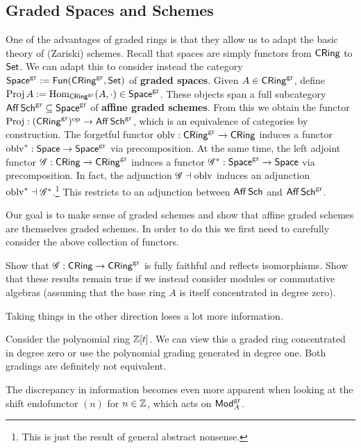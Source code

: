 \documentclass[11pt]{article}
\begin{document}
\subsection{Graded Spaces and Schemes}
One of the advantages of graded rings is that they allow us to adapt the basic theory of (Zariski) schemes. Recall that spaces are simply functors from $\operatorname{\mathsf{CRing}}$ to $\operatorname{\mathsf{Set}}$. We can adapt this to consider instead the category $\operatorname{\mathsf{Space}}^{\operatorname{gr}}:=\operatorname{\mathsf{Fun}}(\operatorname{\mathsf{CRing}}^{\operatorname{gr}},\operatorname{\mathsf{Set}})$ of \textbf{graded spaces}. Given $A\in\operatorname{\mathsf{CRing}}^{\operatorname{gr}}$, define $\operatorname{Proj} A:=\operatorname{Hom}_{\operatorname{\mathsf{CRing}}^{\operatorname{gr}}}(A,\cdot)\in\operatorname{\mathsf{Space}}^{\operatorname{gr}}$. These objects span a full subcategory $\operatorname{\mathsf{Aff}}\operatorname{\mathsf{Sch}}^{\operatorname{gr}}\subseteq\operatorname{\mathsf{Space}}^{\operatorname{gr}}$ of \textbf{affine graded schemes}. From this we obtain the functor $\operatorname{Proj}: (\operatorname{\mathsf{CRing}}^{\operatorname{gr}})^{\operatorname{op}}\to\operatorname{\mathsf{Aff}}\operatorname{\mathsf{Sch}}^{\operatorname{gr}}$, which is an equivalence of categories by construction. The forgetful functor $\operatorname{oblv}: \operatorname{\mathsf{CRing}}^{\operatorname{gr}}\to\operatorname{\mathsf{CRing}}$ induces a functor $\operatorname{oblv}^*: \operatorname{\mathsf{Space}}\to\operatorname{\mathsf{Space}}^{\operatorname{gr}}$ via precomposition. At the same time, the left adjoint functor $\mathscr{G}: \operatorname{\mathsf{CRing}}\to\operatorname{\mathsf{CRing}}^{\operatorname{gr}}$ induces a functor $\mathscr{G}^*: \operatorname{\mathsf{Space}}^{\operatorname{gr}}\to\operatorname{\mathsf{Space}}$ via precomposition. In fact, the adjunction $\mathscr{G}\dashv\operatorname{oblv}$ induces an adjunction $\operatorname{oblv}^*\dashv\mathscr{G}^*$.\footnote{This is just the result of general abstract nonsense.} This restricts to an adjunction between $\operatorname{\mathsf{Aff}}\operatorname{\mathsf{Sch}}$ and $\operatorname{\mathsf{Aff}}\operatorname{\mathsf{Sch}}^{\operatorname{gr}}$. 

Our goal is to make sense of graded schemes and show that affine graded schemes are themselves graded schemes. In order to do this we first need to carefully consider the above collection of functors. 

\begin{exercise}
Show that $\mathscr{G}: \operatorname{\mathsf{CRing}}\to\operatorname{\mathsf{CRing}}^{\operatorname{gr}}$ is fully faithful and reflects isomorphisms. Show that these results remain true if we instead consider modules or commutative algebras (assuming that the base ring $A$ is itself concentrated in degree zero).
\end{exercise}

Taking things in the other direction loses a lot more information. 

\begin{example}
Consider the polynomial ring $\mathbb{Z}[t]$. We can view this a graded ring concentrated in degree zero or use the polynomial grading generated in degree one. Both gradings are definitely not equivalent.
\end{example}

The discrepancy in information becomes even more apparent when looking at the shift endofunctor $(n)$ for $n\in\mathbb{Z}$, which acts on $\operatorname{\mathsf{Mod}}_A^{\operatorname{gr}}$.
\end{document}
